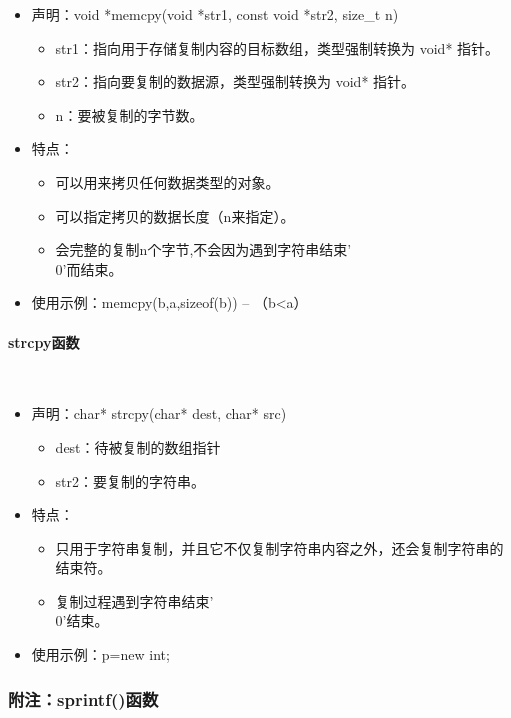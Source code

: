 \documentclass[UTF8]{article}%
\begin{document}
\begin{itemize}
    \item 声明：void *memcpy(void *str1, const void *str2, size\_t n)
    {
    \begin{itemize}
        \item str1：指向用于存储复制内容的目标数组，类型强制转换为 void* 指针。
        \item str2：指向要复制的数据源，类型强制转换为 void* 指针。
        \item n：要被复制的字节数。
    \end{itemize}
    }
    \item 特点：
    {
    \begin{itemize}
        \item 可以用来拷贝任何数据类型的对象。
        \item 可以指定拷贝的数据长度（n来指定）。
        \item 会完整的复制n个字节,不会因为遇到字符串结束'\\0'而结束。
    \end{itemize}
    }
    \item 使用示例：memcpy(b,a,sizeof(b)) -- （b<a）
\end{itemize}

\paragraph{strcpy函数}~{}

\begin{itemize}
    \item 声明：char* strcpy(char* dest, char* src)
    {
    \begin{itemize}
        \item dest：待被复制的数组指针
        \item str2：要复制的字符串。
    \end{itemize}
    }
    \item 特点：
    {
    \begin{itemize}
        \item 只用于字符串复制，并且它不仅复制字符串内容之外，还会复制字符串的结束符。
        \item 复制过程遇到字符串结束'\\0'结束。
    \end{itemize}
    }
    \item 使用示例：p=new int;
\end{itemize}

\subsubsection{附注：sprintf()函数}
\end{document}
